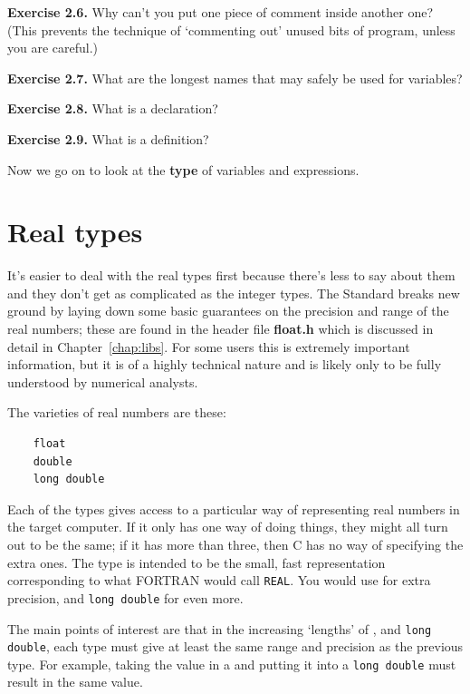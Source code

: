    \textbf{Exercise 2.6.} Why can't you put one piece of comment inside another
    one? (This prevents the technique of `commenting out' unused bits of
    program, unless you are careful.)


   \textbf{Exercise 2.7.} What are the longest names that may safely be used for
    variables?


   \textbf{Exercise 2.8.} What is a declaration?


   \textbf{Exercise 2.9.} What is a definition?


  

  Now we go on to look at the \textbf{type} of variables and
   expressions.


 
        \section{Real types}
        

  

  It's easier to deal with the real types first because there's less to say
   about them and they don't get as complicated as the integer types. The
   Standard breaks new ground by laying down some basic guarantees on the
   precision and range of the real numbers; these are found in the header file
   \textbf{float.h} which is discussed in detail in Chapter~\ref{chap:libs}.
   For some users this is extremely important information, but it is of a
   highly technical nature and is likely only to be fully understood by
   numerical analysts.


  The varieties of real numbers are these:


  \begin{Verbatim}
    float
    double
    long double
  \end{Verbatim}

  Each of the types gives access to a particular way of representing real
  numbers in the target computer. If it only has one way of doing things,
  they might all turn out to be the same; if it has more than three, then C
  has no way of specifying the extra ones. The type \float{} is
  intended to be the small, fast representation corresponding to what FORTRAN
  would call \texttt{REAL}. You would use \double{} for extra
  precision, and \texttt{long double} for even more.


  The main points of interest are that in the increasing `lengths' of
   \float, \double{} and \texttt{long double}, each
   type must give at least the same range and precision as the previous type.
   For example, taking the value in a \double{} and putting it into
   a \texttt{long double} must result in the same value.


